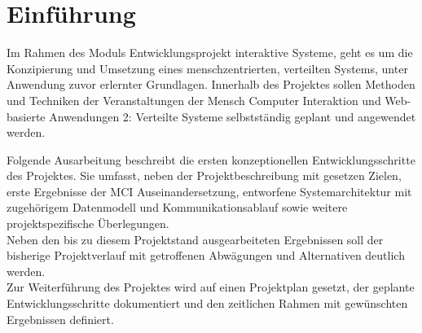 
\chapter{Einführung}
Im Rahmen des Moduls Entwicklungsprojekt interaktive Systeme, geht es um die Konzipierung und Umsetzung eines menschzentrierten, verteilten Systems, unter Anwendung zuvor erlernter Grundlagen. Innerhalb des Projektes sollen Methoden und Techniken der Veranstaltungen der Mensch Computer Interaktion und Web-basierte Anwendungen 2: Verteilte Systeme selbstständig geplant und angewendet werden.

\vspace{0.5cm}

Folgende Ausarbeitung beschreibt die ersten konzeptionellen Entwicklungsschritte des Projektes. Sie umfasst, neben der  Projektbeschreibung mit gesetzen Zielen, erste Ergebnisse der MCI Auseinandersetzung, entworfene Systemarchitektur mit zugehörigem Datenmodell und Kommunikationsablauf sowie weitere projektspezifische Überlegungen.\\
Neben den bis zu diesem Projektstand ausgearbeiteten Ergebnissen soll der bisherige Projektverlauf mit getroffenen Abwägungen und Alternativen deutlich werden.\\
Zur Weiterführung des Projektes wird auf einen Projektplan gesetzt, der geplante Entwicklungsschritte dokumentiert und den zeitlichen Rahmen mit gewünschten Ergebnissen definiert.
